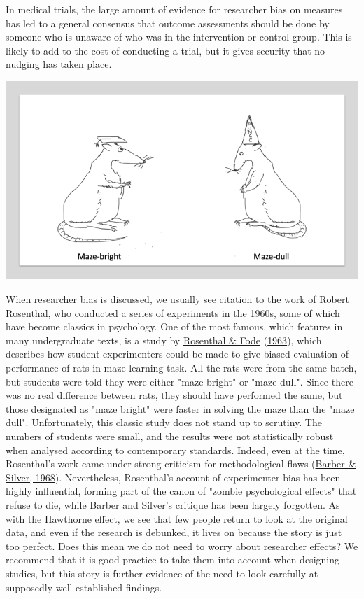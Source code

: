 \documentclass{krantz}
\begin{document}
In medical trials, the large amount of evidence for researcher bias on measures has led to a general consensus that outcome assessments should be done by someone who is unaware of who was in the intervention or control group. This is likely to add to the cost of conducting a trial, but it gives security that no nudging has taken place.

\begin{tcolorbox}[colback=Black!5!lightgray,colframe=black!75!black,coltitle=white,title=Another questionable classic study]\label{box:Rosenthal}

\begin{center}

\includegraphics[width=0.4\linewidth]{images_bw/ratsx2} 
\end{center}
When researcher bias is discussed, we usually see citation to the work of Robert Rosenthal, who conducted a series of experiments in the 1960s, some of which have become classics in psychology. One of the most famous, which features in many undergraduate texts, is a study by \protect\hyperlink{ref-rosenthal1963}{Rosenthal \& Fode} (\protect\hyperlink{ref-rosenthal1963}{1963}), which describes how student experimenters could be made to give biased evaluation of performance of rats in maze-learning task. All the rats were from the same batch, but students were told they were either "maze bright" or "maze dull". Since there was no real difference between rats, they should have performed the same, but those designated as "maze bright" were faster in solving the maze than the "maze dull".  
Unfortunately, this classic study does not stand up to scrutiny. The numbers of students were small, and the results were not statistically robust when analysed according to contemporary standards. Indeed, even at the time, Rosenthal's work came under strong criticism for methodological flaws (\protect\hyperlink{ref-barber1968}{Barber \& Silver, 1968}). Nevertheless, Rosenthal's account of experimenter bias has been highly influential, forming part of the canon of "zombie psychological effects" that refuse to die, while Barber and Silver's critique has been largely forgotten. As with the Hawthorne effect, we see that few people return to look at the original data, and even if the research is debunked, it lives on because the story is just too perfect.  
Does this mean we do not need to worry about researcher effects? We recommend that it is good practice to take them into account when designing studies, but this story is further evidence of the need to look carefully at supposedly well-established findings.
\end{tcolorbox}
\end{document}
